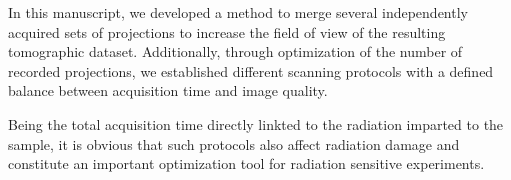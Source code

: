 In this manuscript, we developed a method to merge several independently acquired sets of projections to increase the field of view of the resulting tomographic dataset. Additionally, through optimization of the number of recorded projections, we established different scanning protocols with a defined balance between acquisition time and image quality.
\cbend

\cbstart
Being the total acquisition time directly linkted to the radiation imparted to the sample, it is obvious that such protocols also affect radiation damage and constitute an important optimization tool for radiation sensitive experiments.
\cbend